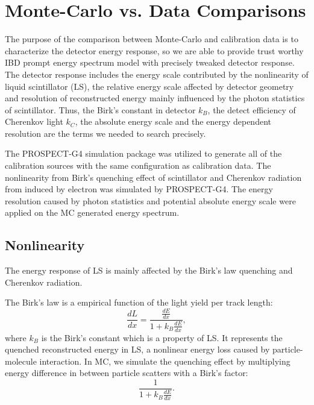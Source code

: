 \section{Monte-Carlo vs. Data Comparisons}
The purpose of the comparison between Monte-Carlo and calibration data is to characterize the detector energy response, so we are able to provide trust worthy IBD prompt energy spectrum model with precisely tweaked detector response. 
The detector response includes the energy scale contributed by the nonlinearity of liquid scintillator (LS), the relative energy scale affected by detector geometry and resolution of reconstructed energy mainly influenced by the photon statistics of scintillator. 
Thus, the Birk’s constant in detector $k_B$, the detect efficiency of Cherenkov light $k_{C}$, the absolute energy scale and the energy dependent resolution are the terms we needed to search precisely.

The PROSPECT-G4 simulation package \cite{PG4} was utilized to generate all of the calibration sources with the same configuration as calibration data. 
The nonlinearity from Birk’s quenching effect of scintillator and Cherenkov radiation from induced by electron was simulated by PROSPECT-G4. 
The energy resolution caused by photon statistics and potential absolute energy scale were applied on the MC generated energy spectrum. 

\subsection{Nonlinearity}
The energy response of LS is mainly affected by the Birk’s law quenching and Cherenkov radiation. 

The Birk’s law is a empirical function of the light yield per track length:
\begin{equation}
    \frac{dL}{dx} = \frac{\frac{dE}{dx}}{1+k_B\frac{dE}{dx}},
\end{equation}
where $k_B$ is the Birk's constant which is a property of LS. 
It represents the quenched reconstructed energy in LS, a nonlinear energy loss caused by particle-molecule interaction. 
In MC, we  simulate the quenching effect by multiplying energy difference in between particle scatters with a Birk's factor:
\begin{equation}
   \frac{1}{1+k_B\frac{dE}{dx}}.
   \label{eql:birks}
\end{equation}



